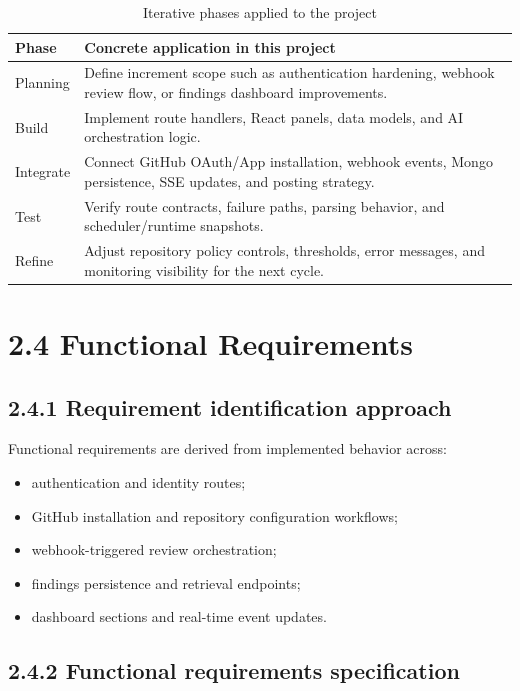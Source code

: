 \begin{table}[htbp]
\centering
\caption{Iterative phases applied to the project}
\label{tab:iterative_phases}
\begin{tabular}{p{}p{}}
\toprule
\textbf{Phase} & \textbf{Concrete application in this project} \\
\midrule
Planning & Define increment scope such as authentication hardening, webhook review flow, or findings dashboard improvements. \\
Build & Implement route handlers, React panels, data models, and AI orchestration logic. \\
Integrate & Connect GitHub OAuth/App installation, webhook events, Mongo persistence, SSE updates, and posting strategy. \\
Test & Verify route contracts, failure paths, parsing behavior, and scheduler/runtime snapshots. \\
Refine & Adjust repository policy controls, thresholds, error messages, and monitoring visibility for the next cycle. \\
\bottomrule
\end{tabular}
\end{table}

\section{2.4 Functional Requirements}

\subsection{2.4.1 Requirement identification approach}

Functional requirements are derived from implemented behavior across:
\begin{itemize}
    \item authentication and identity routes;
    \item GitHub installation and repository configuration workflows;
    \item webhook-triggered review orchestration;
    \item findings persistence and retrieval endpoints;
    \item dashboard sections and real-time event updates.
\end{itemize}

\subsection{2.4.2 Functional requirements specification}

